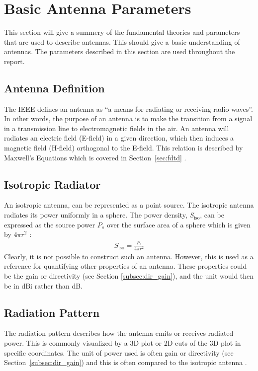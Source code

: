 \section{Basic Antenna Parameters}
\label{sec:basicantennaparams}
\begin{aautop}
This section will give a summery of the fundamental theories and parameters that are used to describe antennas. This should give a basic understanding of antennas. The parameters described in this section are used throughout the report. 
\end{aautop}

\subsection{Antenna Definition}
\label{subsec:antenna-def}
The IEEE defines an antenna as ``a means for radiating or receiving radio waves''. In other words, the purpose of an antenna is to make the transition from a signal in a transmission line to electromagnetic fields in the air. An antenna will radiates an electric field (E-field) in a given direction, which then induces a magnetic field (H-field) orthogonal to the E-field. This relation is described by Maxwell's Equations which is covered in Section~\ref{sec:fdtd} \cite{balanis2012antenna}.

\subsection{Isotropic Radiator}
\label{subsec:isotropic-ant}
An isotropic antenna, can be represented as a point source. The isotropic antenna radiates its power uniformly in a sphere. The power density, $S_{\text{iso}}$, can be expressed as the source power $P_s$ over the surface area of a sphere which is given by $4\pi r^2$ \cite{balanis2012antenna}:
\begin{align} %
    S_{\text{iso}} = \frac{P_s}{4\pi r^2}
\end{align}
Clearly, it is not possible to construct such an antenna. However, this is used as a reference for quantifying other properties of an antenna. These properties could be the gain or directivity (see Section \ref{subsec:dir_gain}), and the unit would then be in \si{dBi} rather than \si{dB}.

\subsection{Radiation Pattern}
\label{subsec:radiation-p}
The radiation pattern describes how the antenna emits or receives radiated power. This is commonly visualized by a 3D plot or 2D cuts of the 3D plot in specific coordinates. The unit of power used is often gain or directivity (see Section~\ref{subsec:dir_gain}) and this is often compared to the isotropic antenna \cite{balanis2012antenna}.


